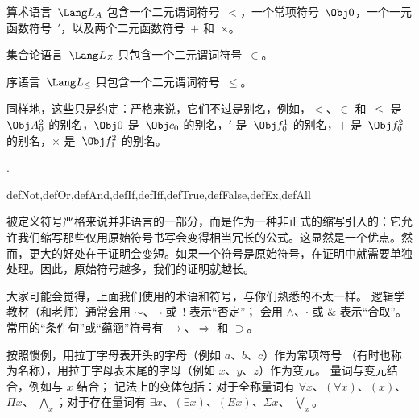 \documentclass[../../../include/open-logic-section]{subfiles}
\begin{document}
\begin{ex}
算术语言~$\Lang L_A$ 包含一个二元谓词符号~$<$，一个常项符号~$\Obj 0$，一个一元函数符号~$\prime$，以及两个二元函数符号~$+$ 和~$\times$。
\end{ex}

\begin{ex}
集合论语言~$\Lang L_Z$ 只包含一个二元谓词符号~$\in$。
\end{ex}

\begin{ex}
序语言~$\Lang L_\le$ 只包含一个二元谓词符号~$\le$。
\end{ex}

同样地，这些只是约定：严格来说，它们不过是别名，例如，$<$、$\in$ 和~$\le$ 是~$\Obj A^2_0$ 的别名，$\Obj 0$ 是~$\Obj c_0$ 的别名，$\prime$ 是~$\Obj f^1_0$ 的别名，$+$ 是~$\Obj f^2_0$ 的别名，$\times$ 是~$\Obj f^2_1$ 的别名。

.

\begin{tagblock}{defNot,defOr,defAnd,defIf,defIff,defTrue,defFalse,defEx,defAll}
\begin{explain}
被定义符号严格来说并非语言的一部分，而是作为一种非正式的缩写引入的：它允许我们缩写那些仅用原始符号书写会变得相当冗长的公式。这显然是一个优点。然而，更大的好处在于证明会变短。如果一个符号是原始符号，在证明中就需要单独处理。因此，原始符号越多，我们的证明就越长。
\end{explain}
\end{tagblock}


\begin{intro}
大家可能会觉得，上面我们使用的术语和符号，与你们熟悉的不太一样。
逻辑学教材（和老师）通常会用 $\sim$、$\neg$ 或~! 表示“否定”；
会用 $\wedge$、$\cdot$ 或 $\&$ 表示“合取”。
常用的“条件句”或“蕴涵”符号有 $\rightarrow$、$\Rightarrow$ 和 $\supset$。

按照惯例，用拉丁字母表开头的字母（例如 $a$、$b$、$c$）作为常项符号
（有时也称为名称），用拉丁字母表末尾的字母（例如 $x$、$y$、$z$）作为变元。
量词与变元结合，例如与 $x$ 结合；
记法上的变体包括：对于全称量词有 $\forall x$、$(\forall x)$、$(x)$、$\Pi x$、
$\bigwedge_x$；对于存在量词有 $\exists x$、$(\exists x)$、$(Ex)$、$\Sigma x$、
$\bigvee_x$。
\end{intro}
\end{document}
